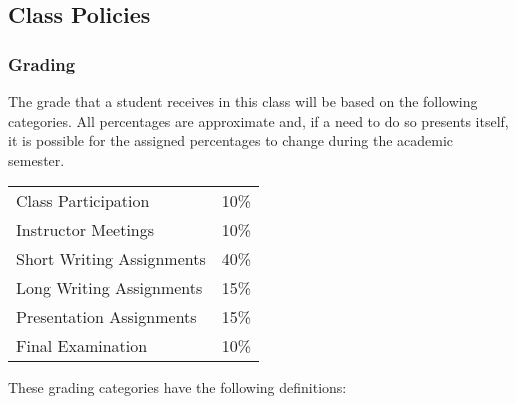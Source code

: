 \subsection*{Class Policies}

\subsubsection*{Grading}

The grade that a student receives in this class will be based on the following categories. All percentages are
approximate and, if a need to do so presents itself, it is possible for the assigned percentages to change during the
academic semester.

\begin{center}
\begin{tabular}{ll}
Class Participation & 10\% \\
Instructor Meetings & 10\% \\
Short Writing Assignments & 40\% \\
Long Writing Assignments & 15\% \\
Presentation Assignments & 15\% \\
Final Examination & 10\%
\end{tabular}
\end{center}

\noindent
\vspace*{-.1in}
These grading categories have the following definitions:

